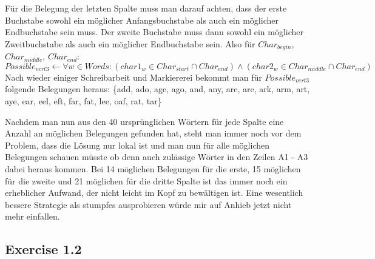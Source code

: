 \documentclass[]{article}
\begin{document}
Für die Belegung der letzten Spalte muss man darauf achten, dass der erste Buchstabe sowohl ein möglicher Anfangsbuchstabe als auch ein möglicher Endbuchstabe sein muss. Der zweite Buchstabe muss dann sowohl ein möglicher Zweitbuchstabe als auch ein möglicher Endbuchstabe sein.\newline
Also für $Char_{begin}$, $Char_{middle}$, $Char_{end}$:
\[ Possible_{vert3} \leftarrow \forall w \in Words : (char1_w \in Char_{start} \cap Char_{end}) \wedge (char2_w \in Char_{middle} \cap Char_{end}) \]
Nach wieder einiger Schreibarbeit und Markiererei bekommt man für $Possible_{vert3}$ folgende Belegungen heraus:\newline
\{add, ado, age, ago, and, any, arc, are, ark, arm, art, aye, ear, eel, eft, far, fat, lee, oaf, rat, tar\}

Nachdem man nun aus den 40 ursprünglichen Wörtern für jede Spalte eine Anzahl an möglichen Belegungen gefunden hat, steht man immer noch vor dem Problem, dass die Lösung nur lokal ist und man nun für alle möglichen Belegungen schauen müsste ob denn auch zulässige Wörter in den Zeilen A1 - A3 dabei heraus kommen. Bei 14 möglichen Belegungen für die erste, 15 möglichen für die zweite und 21 möglichen für die dritte Spalte ist das immer noch ein erheblicher Aufwand, der nicht leicht im Kopf zu bewältigen ist. Eine wesentlich bessere Strategie als stumpfes ausprobieren würde mir auf Anhieb jetzt nicht mehr einfallen.
\pagebreak
\subsection{Exercise 1.2}\label{exercise-1.2}
\end{document}
